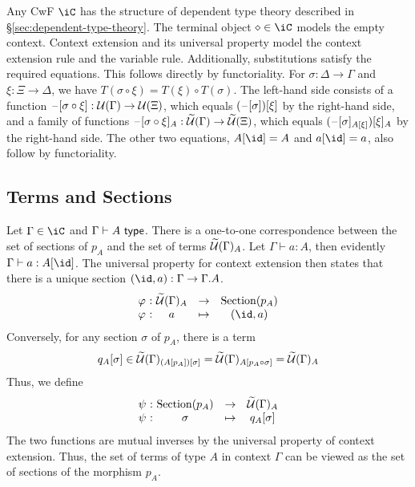 \documentclass{amsart}
\begin{document}
Any CwF $\iC$ has the structure of dependent type theory described in \S \ref{sec:dependent-type-theory}.
The terminal object $\diamond \in \iC$ models the empty context.
Context extension and its universal property model the context extension rule and the variable rule.
Additionally, substitutions satisfy the required equations.
This follows directly by functoriality.
For $\sigma : \Delta \to \Gamma$ and $\xi : \Xi \to \Delta$, we have $T(\sigma \circ \xi) = T(\xi) \circ T(\sigma)$.
The left-hand side consists of a function $\mathord{\hspace{1pt}\text{--}\hspace{1pt}}[\sigma \circ \xi] : \mathcal{U}(\Gamma) \to \mathcal{U}(\Xi)$, which equals $(\mathord{\hspace{1pt}\text{--}\hspace{1pt}}[\sigma])[\xi]$ by the right-hand side, and a family of functions $\mathord{\hspace{1pt}\text{--}\hspace{1pt}}[\sigma \circ \xi]_{A} : \widetilde{\mathcal{U}}(\Gamma) \to \widetilde{\mathcal{U}}(\Xi)$, which equals $(\mathord{\hspace{1pt}\text{--}\hspace{1pt}}[\sigma]_{A[\xi]})[\xi]_{A}$ by the right-hand side.
The other two equations, $A[\id] = A$ and $a[\id] = a$, also follow by functoriality.


\subsection{Terms and Sections}
\label{sec:cwf-terms-and-sections}
Let $\Gamma \in \iC$ and $\Gamma \vdash A ~\mathsf{type}$.
There is a one-to-one correspondence between the set of sections of $p_{A}$ and the set of terms $\widetilde{\mathcal{U}}(\Gamma)_{A}$.
Let $\Gamma \vdash a : A$, then evidently $\Gamma \vdash a : A[\id]$.
The universal property for context extension then states that there is a unique section $(\id, a) : \Gamma \to \Gamma.A$.
\[
  \begin{array}{r@{~:~}ccc}
    \varphi & \Tm(\Gamma)_{A} & \to & \mathrm{Section}(p_{A})\\
    \varphi & a & \mapsto & (\id, a)
  \end{array}
\]
Conversely, for any section $\sigma$ of $p_{A}$, there is a term
\[
  q_{A}[\sigma] \in \widetilde{\mathcal{U}}(\Gamma)_{(A[p_{A}])[\sigma]} = \widetilde{\mathcal{U}}(\Gamma)_{A[p_{A} \circ \sigma]} = \widetilde{\mathcal{U}}(\Gamma)_{A}
\]
Thus, we define
\[
  \begin{array}{r@{~:~}ccc}
    \psi & \mathrm{Section}(p_{A}) & \to & \Tm(\Gamma)_{A}\\
    \psi & \sigma & \mapsto & q_{A}[\sigma]
  \end{array}
\]
The two functions are mutual inverses by the universal property of context extension.
Thus, the set of terms of type $A$ in context $\Gamma$ can be viewed as the set of sections of the morphism $p_{A}$.

\end{document}
